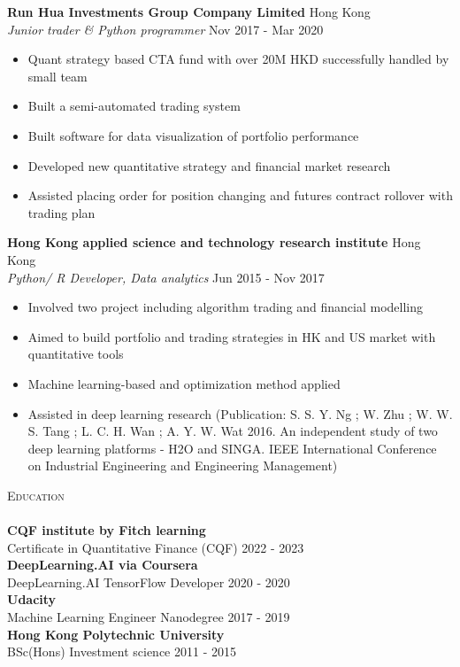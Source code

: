 \documentclass[a4paper]{article}
\newcommand{\lineunder} {
    \vspace*{-8pt} \\
    \hspace*{-18pt} \hrulefill \\
}
\newcommand{\header} [1] {
    {\hspace*{-18pt}\vspace*{6pt} \textsc{#1}}
    \vspace*{-6pt} \lineunder
}
\begin{document}
\textbf{Run Hua Investments Group Company Limited} \hfill Hong Kong\\
\textit{Junior trader \& Python programmer} \hfill Nov 2017 - Mar 2020\\
\vspace{-1mm}
\begin{itemize} \itemsep 1pt
	\item Quant strategy based CTA fund with over 20M HKD successfully handled by small team
	\item Built a semi-automated trading system
	\item Built software for data visualization of portfolio performance
	\item Developed new quantitative strategy and financial market research
        \item Assisted placing order for position changing and futures contract rollover with trading plan
\end{itemize}
\textbf{Hong Kong applied science and technology research institute} \hfill Hong Kong\\
\textit{Python/ R Developer, Data analytics} \hfill Jun 2015 - Nov 2017\\
\vspace{-1mm}
\begin{itemize} \itemsep 1pt
	\item Involved two project including algorithm trading and financial modelling
	\item Aimed to build portfolio and trading strategies in HK and US market with quantitative tools
	\item Machine learning-based and optimization method applied
	\item Assisted in deep learning research (Publication: S. S. Y. Ng ; W. Zhu ; W. W. S. Tang ; L. C. H. Wan ; A. Y. W. Wat 2016. An independent study of two deep learning platforms - H2O and SINGA. IEEE International Conference on Industrial Engineering and Engineering Management)
\end{itemize}

\header{Education}
\textbf{CQF institute by Fitch learning}\\
Certificate in Quantitative Finance (CQF) \hfill 2022 - 2023\\
\vspace{2mm}
\textbf{DeepLearning.AI via Coursera}\\
DeepLearning.AI TensorFlow Developer \hfill 2020 - 2020\\
\vspace{2mm}
\textbf{Udacity}\\
Machine Learning Engineer Nanodegree \hfill 2017 - 2019\\
\vspace{2mm}
\textbf{Hong Kong Polytechnic University}\\
BSc(Hons) Investment science \hfill 2011 - 2015\\
\vspace{2mm}
\end{document}

